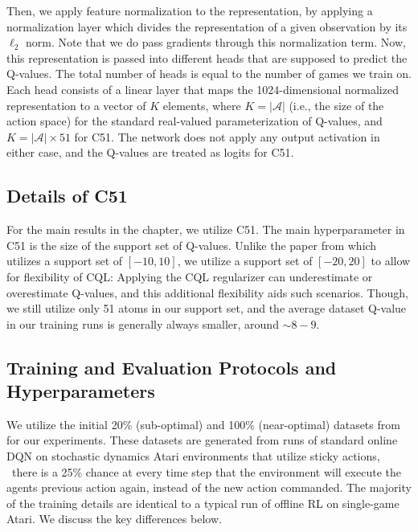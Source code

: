 Then, we apply feature normalization to the representation, by applying a normalization layer which divides the representation of a given observation by its $\ell_2$ norm. Note that we do pass gradients through this normalization term. Now, this representation is passed into different heads that are supposed to predict the Q-values. 
The total number of heads is equal to the number of games we train on. Each head consists of a linear layer that maps the 1024-dimensional normalized representation to a vector of $K$ elements, where $K = |\mathcal{A}|$ (i.e., the size of the action space) for the standard real-valued parameterization of Q-values, and $K = |\mathcal{A}| \times 51$ for C51. The network does not apply any output activation in either case, and the Q-values are treated as logits for C51.  

\subsection{Details of C51}
\label{sec:c51_details}

For the main results in the chapter, we utilize C51. The main hyperparameter in C51 is the size of the support set of Q-values. Unlike the paper from \citet{bellemare2017distributional} which utilizes a support set of $[-10, 10]$, we utilize a support set of $[-20, 20]$ to allow for flexibility of CQL: Applying the CQL regularizer can underestimate or overestimate Q-values, and this additional flexibility aids such scenarios. Though, we still utilize only 51 atoms in our support set, and the average dataset Q-value in our training runs is generally always smaller, around $\sim 8-9$.

\subsection{Training and Evaluation Protocols and Hyperparameters}

We utilize the initial 20\% (sub-optimal) and 100\% (near-optimal) datasets from \citet{agarwal2019optimistic} for our experiments. These datasets are generated from runs of standard online DQN on stochastic dynamics Atari environments that utilize sticky actions, \ie\ there is a 25\% chance at every time step that the environment will execute the agents previous action again, instead of the new action commanded. The majority of the training details are identical to a typical run of offline RL on single-game Atari. We discuss the key differences below. 


